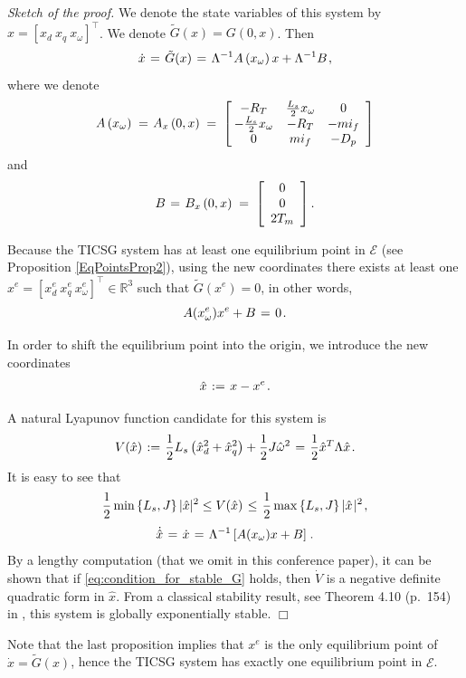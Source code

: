 \documentclass{ifacconf}
\newcommand{\rline}  {{\mathbb R}}
\renewcommand{\L}    {{\Lambda}}
\renewcommand{\o}    {{\omega}}
\renewcommand{\half} {{\frac{1}{2}}}
\newcommand{\m}      {{\hbox{\hskip 1pt}}}
\newcommand{\nm}     {{\hbox{\hskip -3pt}}}
\newcommand{\Emscr}  {{\mathcal{E}}}
\begin{document}
\medskip
{\em Sketch of the proof.} \m
We denote the state variables of this system by $x=\left[x_d\ x_q\ 
x_\o\right]^\top$. We denote $\tilde G(x)=G(0,x)$. Then
$$ \dot{x} \m=\m \tilde{G}(x) \m=\m \L^{-1} A\left( x_\o \right)x +
   \L^{-1} B \m,$$
where we denote
$$ A\left( x_\o \right) \m=\m A_x\left(0,x\right) \m=\m \left[\nm
   \begin{array}{ccc} - R_T & \frac{L_s}{2} x_\o & 0\\ -\frac{L_s}{2}
   x_\o & -R_T & -mi_f\\ 0 & mi_f & -D_p \end{array}\right]$$
and
$$ B \m=\m B_x\left(0,x \right) \m=\m \left[\begin{array}{c} 
   0\\ 0\\ 2T_m \end{array}\right].$$

Because the TICSG system has at least one equilibrium point in
$\Emscr$ (see Proposition \ref{EqPointsProp2}), using the new
coordinates there exists at least one $x^e=\left[x_d^e\ x_q^e\ 
x_\o^e\right]^\top\in\rline^3$ such that $\tilde{G}(x^e)=0$, 
in other words, 
\begin{equation} \label{eq:G_at_equilibrium}
   A(x_\o^e) x^e + B \m=\m 0 \m.
\end{equation}

In order to shift the equilibrium point into the origin, we introduce
the new coordinates
$$\hat{x} \m:=\m x-x^e \m.$$

A natural Lyapunov function candidate for this system is 
$$ V(\hat{x}) \m:=\m \half L_s\left(\hat{x}_d^2+\hat{x}_q^2
   \right)+\half J\hat{\o}^2 \m=\m \half\hat{x}^T\L\hat{x} \m.$$
It is easy to see that
$$ \half \min\left\{L_{s},J\right\}|\hat{x}|{}^{2}\leq V(\hat{x})
   \m\leq\m \frac{1}{2} \max\left\{L_{s},J\right\}|\hat{x}\m
   |^{2} \m,$$
\begin{equation} \label{eq:x_hat_dynamic}
   \dot{\hat{x}} \m=\m \dot{x} \m=\m \L^{-1} \left[ A(x_\o) x+
   B \right] \m.
\end{equation}
By a lengthy computation (that we omit in this conference paper), it 
can be shown that if \eqref{eq:condition_for_stable_G} holds, then 
$\dot V$ is a negative definite quadratic form in $\hat x$. From a 
classical stability result, see Theorem 4.10 (p.~154) 
in \cite{Khalil}, this system is globally exponentially stable. 
\m $\Box$

Note that the last proposition implies that $x^e$ is the only 
equilibrium point of $\dot{x}=\tilde{G}(x)$, hence the TICSG system 
has exactly one equilibrium point in $\Emscr$.
\end{document}
